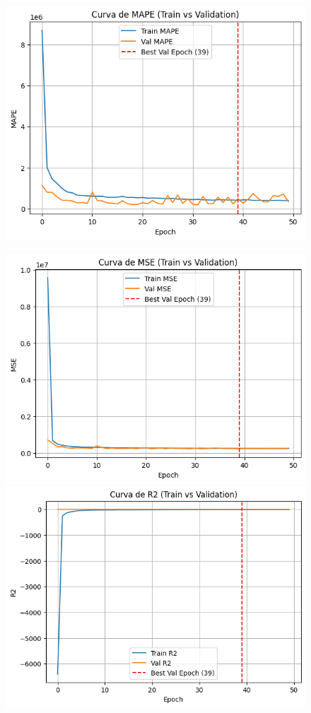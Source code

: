 \begin{figure}[H]
\begin{minipage}{0.48\textwidth}
		\includegraphics[width=\linewidth]{includes/cap5/graphs/sid5_mlp_mape.png}
	\end{minipage}
	\hfill
	\begin{minipage}{0.48\textwidth}
		\centering
		\includegraphics[width=\linewidth]{includes/cap5/graphs/sid5_mlp_mse.png}
		\vspace{0.2cm}
		\includegraphics[width=\linewidth]{includes/cap5/graphs/sid5_mlp_r2.png}

\end{minipage}
\end{figure}
